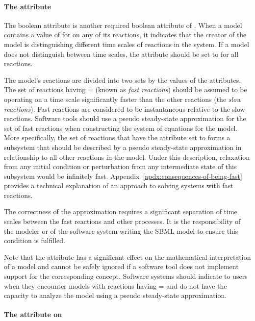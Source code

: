 \paragraph{The  attribute}
\label{sec:fast}

The boolean attribute  is another required boolean
attribute of \Reaction.  When a model contains a value of
 for  on any of its reactions, it indicates
that the creator of the model is distinguishing different time
scales of reactions in the system.  If a model does not
distinguish between time scales, the  attribute should
be set to  for all reactions.

The model's reactions are divided into two sets by the
values of the  attributes.  The set of reactions
having = (known as \emph{fast reactions})
should be assumed to be operating on a time scale significantly
faster than the other reactions (the \emph{slow reactions}).  Fast
reactions are considered to be instantaneous relative to the slow
reactions.  Software tools should use a pseudo steady-state
approximation for the set of fast reactions when constructing the
system of equations for the model.  More specifically, the set of
reactions that have the  attribute set to 
forms a subsystem that should be described by a pseudo
steady-state approximation in relationship to all other reactions
in the model.  Under this description, relaxation from any initial
condition or perturbation from any intermediate state of this
subsystem would be infinitely fast.
Appendix~\ref{apdx:consequences-of-being-fast} provides a
technical explanation of an approach to solving systems with fast
reactions.

The correctness of the approximation requires a significant
separation of time scales between the fast reactions and other
processes.  It is the responsibility of the modeler or of the
software system writing the SBML model to ensure this condition is
fulfilled.

Note that the  attribute has a significant effect on
the mathematical interpretation of a model and cannot be safely
ignored if a software tool does not implement support for the
corresponding concept.  Software systems should indicate to users
when they encounter models with reactions having
= and do not have the capacity to analyze
the model using a pseudo steady-state approximation.


\paragraph{The  attribute on }
\label{sec:reaction-compartment}

